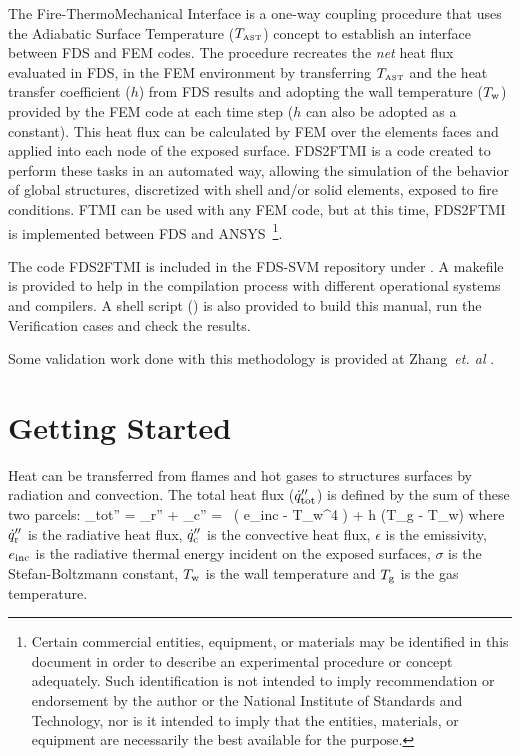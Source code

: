 \documentclass[11pt]{book}
\begin{document}
The Fire-ThermoMechanical Interface \cite{FTMI:Methodology} is a one-way coupling procedure that uses the Adiabatic Surface Temperature ($T_{\hbox{\tiny AST}}$) concept \cite{Wickstrom:Interflam2007,Wickstrom_AST} to establish an interface between FDS and FEM codes. The procedure recreates the {\em net} heat flux evaluated in FDS, in the FEM environment by transferring $T_{\hbox{\tiny AST}}$ and the heat transfer coefficient ($h$) from FDS results and adopting the wall temperature ($T_{\rm w}$) provided by the FEM code at each time step  ($h$ can also be adopted as a constant). This heat flux can be calculated by FEM over the elements faces and applied into each node of the exposed surface. FDS2FTMI is a code created to perform these tasks in an automated way, allowing the simulation of the behavior of global structures, discretized with shell and/or solid elements, exposed to fire conditions. FTMI can be used with any FEM code, but at this time, FDS2FTMI is implemented between FDS and A{\footnotesize NSYS}~\footnote{Certain commercial entities, equipment, or materials may be identified in this document in order to describe an experimental procedure or concept adequately. Such identification is not intended to imply recommendation or endorsement by the author or the National Institute of Standards and Technology, nor is it intended to imply that the entities, materials, or equipment are necessarily the best available for the purpose.}.

The code FDS2FTMI is included in the FDS-SVM repository \cite{FDS-SMV_repository} under . A makefile is provided to help in the compilation process with different operational systems and compilers. A shell script () is also provided to build this manual, run the Verification cases and check the results.  

Some validation work done with this methodology is provided at Zhang~{\textit {et. al}} \cite{FTMI:Validation}.

\chapter{Getting Started}
\label{info:start}

Heat can be transferred from flames and hot gases to structures surfaces by radiation and convection. The total heat flux ($\dot{q}_{\rm tot}''$) is defined by the sum of these two parcels: 
\be \label{eq_qtot} _{\rm tot}'' = _{\rm r}'' + _{\rm c}'' = \epsilon \, \left( {e}_{\rm inc} - \sigma T_{\rm w}^4 \right) + h (T_{\rm g} - T_{\rm w})  \ee  
where $\dot{q}_{\rm r}''$ is the radiative heat flux, $\dot{q}_{\rm c}''$ is the convective heat flux, $\epsilon$ is the emissivity, ${e}_{\rm inc}$ is the radiative thermal energy incident on the exposed surfaces, $\sigma$ is the Stefan-Boltzmann constant, $T_{\rm w}$ is the wall temperature and $T_{\rm g}$ is the gas temperature.
\end{document}
